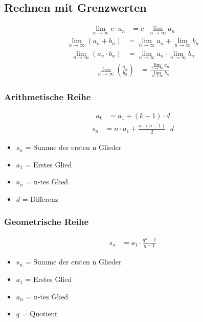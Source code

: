\subsection{Rechnen mit Grenzwerten}
\begin{align*}
	\lim_{n \to \infty} c \cdot a_n & = c \cdot \lim_{n \to \infty} a_n
\end{align*}
\begin{align*}
	\lim_{n \to \infty} (a_n + b_n) & = \lim_{n \to \infty} a_n + \lim_{n \to \infty} b_n
\end{align*}
\begin{align*}
	\lim_{n \to \infty} (a_n \cdot b_n) & = \lim_{n \to \infty} a_n \cdot \lim_{n \to \infty} b_n
\end{align*}
\begin{align*}
	\lim_{n \to \infty}(\frac{a_n}{b_n}) & = \frac{\lim_{n \to \infty} a_n}{\lim_{n \to \infty} b_n}
\end{align*}
\subsubsection{Arithmetische Reihe}
\begin{align*}
	a_k & = a_1 + (k-1) \cdot d
\end{align*}
\begin{align*}
    s_n & =n \cdot a_1 + \frac{n \cdot (n-1)}{2} \cdot d
\end{align*}
\begin{itemize}
	\item $s_n$ = Summe der ersten n Glieder
	\item $a_1$ = Erstes Glied
	\item $a_n$ = n-tes Glied
	\item $d$ = Differenz
\end{itemize}
\subsubsection{Geometrische Reihe}
\begin{align*}
    s_n & = a_1 \cdot \frac{q^n-1}{q-1}
\end{align*}
\begin{itemize}
	\item $s_n$ = Summe der ersten n Glieder
	\item $a_1$ = Erstes Glied
	\item $a_n$ = n-tes Glied
	\item $q$ = Quotient
\end{itemize}
